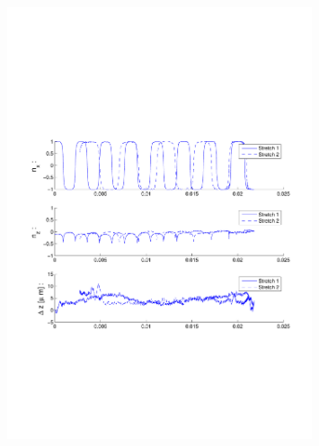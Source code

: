 \begin{figure}[H]

\centering

\includegraphics[width=0.8\textwidth]{Images/Particle 1/Stretch1.pdf}

\end{figure}

